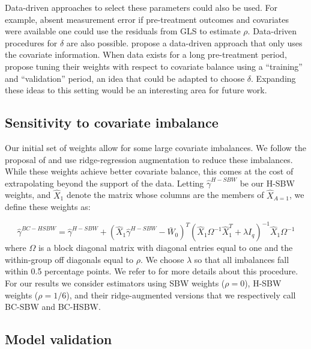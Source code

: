 \documentclass[aoas]{imsart}
\theoremstyle{plain}
\theoremstyle{remark}
\begin{document}
Data-driven approaches to select these parameters could also be used. For example, absent measurement error if pre-treatment outcomes and covariates were available one could use the residuals from GLS to estimate $\rho$. Data-driven procedures for $\delta$ are also possible. \cite{wang2020minimal} propose a data-driven approach that only uses the covariate information. When data exists for a long pre-treatment period, \cite{abadie2015comparative} propose tuning their weights with respect to covariate balance using a ``training'' and ``validation'' period, an idea that could be adapted to choose $\delta$. Expanding these ideas to this setting would be an interesting area for future work.

\subsection{Sensitivity to covariate imbalance}

Our initial set of weights allow for some large covariate imbalances. We follow the proposal of \cite{ben2021augmented} and use ridge-regression augmentation to reduce these imbalances. While these weights achieve better covariate balance, this comes at the cost of extrapolating beyond the support of the data. Letting $\hat{\gamma}^{H-SBW}$ be our H-SBW weights, and $\hat{X}_1$ denote the matrix whose columns are the members of $\hat{X}_{A=1}$, we define these weights as:

\begin{equation}
\hat{\gamma}^{BC-HSBW} = \hat{\gamma}^{H-SBW} + (\hat{X}_1\hat{\gamma}^{H-SBW} - \bar{W}_0)^T(\hat{X}_1\Omega^{-1}\hat{X}_1^T + \lambda I_q)^{-1}\hat{X}_1\Omega^{-1}
\end{equation}
%
where $\Omega$ is a block diagonal matrix with diagonal entries equal to one and the within-group off diagonals equal to $\rho$. We choose $\lambda$ so that all imbalances fall within 0.5 percentage points. We refer to \cite{ben2021augmented} for more details about this procedure. For our results we consider estimators using SBW weights ($\rho = 0$), H-SBW weights ($\rho = 1/6$), and their ridge-augmented versions that we respectively call BC-SBW and BC-HSBW.

\subsection{Model validation}
\end{document}
